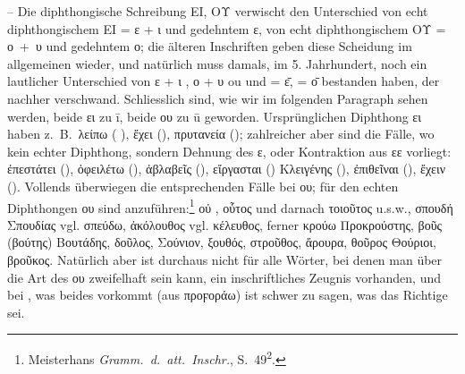 \noindent -- \label{peiou}Die diphthongische Schreibung ΕΙ,
ΟΥ verwischt den Unterschied von echt diphthongischem ΕΙ = ε + ι und gedehntem
ε, von echt diphthongischem ΟΥ = \mbox{ο + υ} und gedehntem ο; die älteren Inschriften
geben diese Scheidung im allgemeinen wieder, und natürlich muss damals, im 5.
Jahrhundert, noch ein lautlicher Unterschied von ε + ι , ο + υ ou und
 =
ε̄,  = ο̄ bestanden haben, der nachher verschwand.
Schliesslich sind, wie wir im folgenden Paragraph sehen werden, beide ει zu ī,
beide ου zu ū geworden.
Ursprünglichen Diphthong ει haben z.~B.\ λείπω ( ),
ἔχει (), πρυτανεία (); zahlreicher aber
sind die Fälle, wo kein echter Diphthong, sondern Dehnung des ε, oder
Kontraktion aus εε vorliegt: ἐπεστάτει (), ὀφειλέτω
(), ἀβλαβεῖς (), εἴργασται
(\mbox{}) Κλειγένης (), ἐπιθεῖναι
(), ἔχειν ().
Vollends überwiegen die entsprechenden Fälle bei ου; für den echten Diphthongen
ου sind anzuführen:\footnote{Meisterhans \emph{Gramm.~d.~att.~Inschr.}, S.\
	49\textsuperscript{2}.} οὐ , οὗτος
 und darnach τοιοῦτος u.s.w., σπουδή Σπουδίας
 vgl. σπεύδω, ἀκόλουθος  vgl.
κέλευθος, ferner κρούω Προκρούστης, βοῦς (βούτης) Βουτάδης, δοῦλος, Σούνιον,
ξουθός, στροῦθος, ἄρουρα, θοῦρος Θούριοι, βροῦκος. Natürlich aber ist durchaus
nicht für alle Wörter, bei denen man über die Art des ου zweifelhaft sein kann,
ein inschriftliches Zeugnis vorhanden, und bei \epigraphic{ΦΡΟΥΡΟΣ ΦΡΟΡΟΣ}, was beides vorkommt (aus προϝοράω) ist schwer zu sagen, was das Richtige sei.

